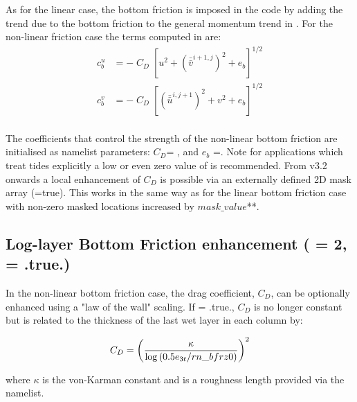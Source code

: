 \documentclass[NEMO_book]{subfiles}
\begin{document}
As for the linear case, the bottom friction is imposed in the code by 
adding the trend due to the bottom friction to the general momentum trend 
in .
For the non-linear friction case the terms
computed in   are: 
\begin{equation} \label{Eq_zdfbfr_nonlinbfr}
\begin{split}
 c_b^u &= - \; C_D\;\left[ u^2 + \left(\bar{\bar{v}}^{i+1,j}\right)^2 + e_b \right]^{1/2}\\
 c_b^v &= - \; C_D\;\left[  \left(\bar{\bar{u}}^{i,j+1}\right)^2 + v^2 + e_b \right]^{1/2}\\
\end{split}
\end{equation}

The coefficients that control the strength of the non-linear bottom friction are
initialised as namelist parameters: $C_D$= , and $e_b$ =.
Note for applications which treat tides explicitly a low or even zero value of
 is recommended. From v3.2 onwards a local enhancement of $C_D$ is possible
via an externally defined 2D mask array (=true).  This works in the same way
as for the linear bottom friction case with non-zero masked locations increased by
$mask\_value$**.

\subsection{Log-layer Bottom Friction enhancement ( = 2,  = .true.)}
\label{ZDF_bfr_loglayer}

In the non-linear bottom friction case, the drag coefficient, $C_D$, can be optionally
enhanced using a "law of the wall" scaling. If   = .true., $C_D$ is no
longer constant but is related to the thickness of the last wet layer in each column by:

\begin{equation}
C_D = \left ( {\kappa \over {\rm log}\left ( 0.5e_{3t}/rn\_bfrz0 \right ) } \right )^2
\end{equation}

\noindent where $\kappa$ is the von-Karman constant and  is a roughness
length provided via the namelist.
\end{document}
